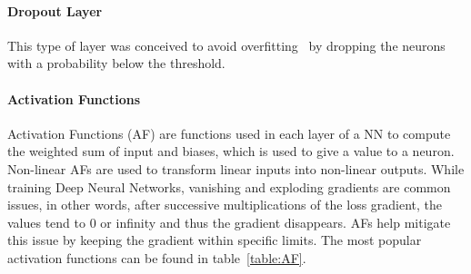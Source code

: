 \documentclass[conference]{IEEEtran}
\begin{document}
\paragraph{Dropout Layer}

This type of layer was conceived to avoid overfitting~\cite{Dropout} by dropping
the neurons with a probability below the threshold. 

\paragraph{Activation Functions}

Activation Functions (AF) are functions used in each layer of a NN
to compute the weighted sum of input and biases, which is used to give a value
to a neuron. Non-linear AFs are used to transform linear inputs into non-linear
outputs.  While training Deep Neural Networks, vanishing and exploding
gradients are common issues, in other words, after successive multiplications
of the loss gradient, the values tend to 0 or infinity and thus the
gradient disappears. AFs help mitigate this issue by keeping the gradient within
specific limits. The most popular activation functions can be found in
table~\ref{table:AF}.
\end{document}

